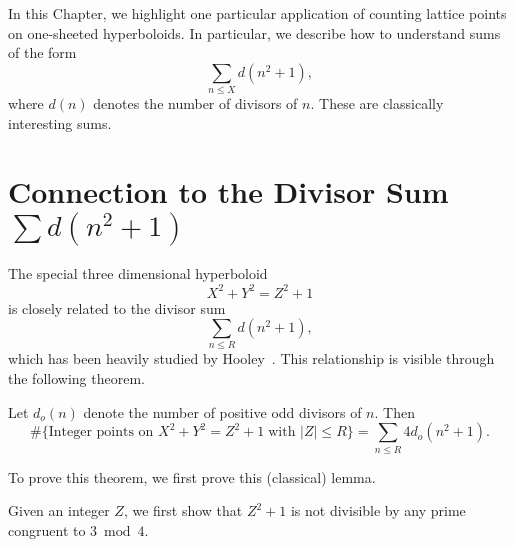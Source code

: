 


In this Chapter, we highlight one particular application of counting lattice points on
one-sheeted hyperboloids.
In particular, we describe how to understand sums of the form
\begin{equation}
  \sum_{n \leq X} d (n^2 + 1),
\end{equation}
where $d(n)$ denotes the number of divisors of $n$.
These are classically interesting sums.



\section*{Connection to the Divisor Sum $\sum d(n^2 + 1)$}


The special three dimensional hyperboloid
\begin{equation}
  X^2 + Y^2 = Z^2 + 1
\end{equation}
is closely related to the divisor sum
\begin{equation}
  \sum_{n \leq R} d(n^2 + 1),
\end{equation}
which has been heavily studied by Hooley~\cite{Hooley63}.
This relationship is visible through the following theorem.


\begin{theorem}
  Let $d_o(n)$ denote the number of positive odd divisors of $n$.
  Then
  \begin{equation}
    \#\{\text{Integer points on } X^2 + Y^2 = Z^2 + 1 \; \text{with } \lvert Z \rvert \leq
    R \} = \sum_{n \leq R} 4 d_o(n^2 + 1).
  \end{equation}
\end{theorem}



To prove this theorem, we first prove this (classical) lemma.



\begin{lemma}
  Given an integer $Z$, we first show that $Z^2 + 1$ is not divisible by any prime
  congruent to $3 \bmod 4$.
\end{lemma}


